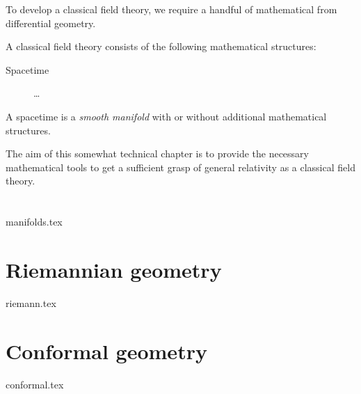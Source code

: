 








\phpar

To develop a classical field theory, we require a handful of mathematical  from differential geometry.

A classical field theory consists of the following mathematical structures:
\begin{description}
    \item[Spacetime] \dots
\end{description}

A spacetime is a \emph{smooth manifold} with or without additional mathematical structures.



The aim of this somewhat technical chapter is to provide the necessary mathematical tools to get a sufficient grasp of general relativity as a classical field theory.




\section{}
    {{manifolds.tex}}



\section{Riemannian geometry}\label{sec:diffgeo:riemann}
    {{riemann.tex}}


\section{Conformal geometry}\label{sec:diffgeo:conformal}
    {{conformal.tex}}
